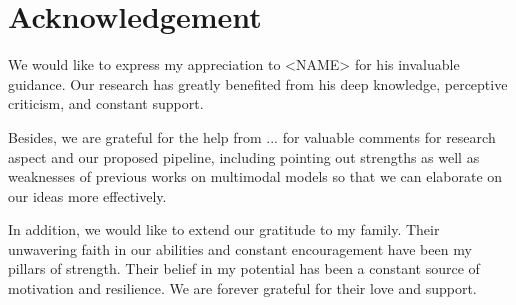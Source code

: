 \chapter*{Acknowledgement}

We would like to express my appreciation to <NAME> for his invaluable guidance. Our research has greatly benefited from his deep knowledge, perceptive criticism, and constant support.

\noindent Besides, we are grateful for the help from ... for valuable comments for research aspect and our proposed pipeline, including pointing out strengths as well as weaknesses of previous works on multimodal models so that we can elaborate on our ideas more effectively.

\noindent In addition, we would like to extend our gratitude to my family. Their unwavering faith in our abilities and constant encouragement have been my pillars of strength. Their belief in my potential has been a constant source of motivation and resilience. We are forever grateful for their love and support.
